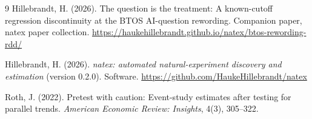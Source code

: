 \documentclass[11pt]{article}
\begin{document}
\begin{thebibliography}{9}
Hillebrandt, H. (2026).
The question is the treatment: A known-cutoff regression discontinuity at
the BTOS AI-question rewording.
Companion paper, natex paper collection.
\url{https://haukehillebrandt.github.io/natex/btos-rewording-rdd/}

Hillebrandt, H. (2026).
\emph{natex: automated natural-experiment discovery and estimation} (version
0.2.0). Software.
\url{https://github.com/HaukeHillebrandt/natex}

Roth, J. (2022).
Pretest with caution: Event-study estimates after testing for parallel
trends.
\emph{American Economic Review: Insights}, 4(3), 305--322.

\end{thebibliography}
\end{document}
